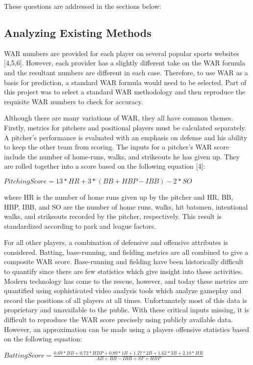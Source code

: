 \documentclass{article} %
\begin{document}
These questions are addressed in the sections below:


\subsection{Analyzing Existing Methods} 


WAR numbers are provided for each player on several popular sports websites [4,5,6].  However, each provider has a slightly different take on the WAR formula and the resultant numbers are different in each case.  Therefore, to use WAR as a basis for prediction, a standard WAR formula would need to be selected.  Part of this project was to select a standard WAR methodology and then reproduce the requisite WAR numbers to check for accuracy. 

Although there are many variations of WAR, they all have common themes. Firstly, metrics for pitchers and positional players must be calculated separately. A pitcher's performance is evaluated with an emphasis on defense and his ability to keep the other team from scoring.  The inputs for a pitcher's WAR score include the number of home-runs, walks, and strikeouts he has given up.  They are rolled together into a score based on the following equation [4]:
 \begin{center}
 $ Pitching Score = 13 * HR + 3* (BB + HBP - IBB) - 2*SO$
 \end{center} 
where HR is the number of home runs given up by the pitcher and HR, BB, HBP, IBB, and SO are the number of home runs, walks, hit batsmen, intentional walks, and strikeouts recorded by the pitcher, respectively.  This result is standardized according to park and league factors.

For all other players, a combination of defensive and offensive attributes is considered. Batting, base-running, and fielding metrics are all combined to give a composite WAR score.  Base-running and fielding have been historically difficult to quantify since there are few statistics which give insight into these activities.  Modern technology has come to the rescue, however, and today these metrics are quantified using sophisticated video analysis tools which analyze gameplay and record the positions of all players at all times.  Unfortunately most of this data is proprietary and unavailable to the public.  With these critical inputs missing, it is difficult to reproduce the WAR score precisely using publicly available data.  However, an approximation can be made using a players offensive statistics based on the following equation: 
 \begin{center}
 $ BattingScore = \frac{0.69 * BB + 0.72 * HBP + 0.89 * 1B + 1.27 * 2B + 1.62 * 3B + 2.10 * HR}{AB+BB-IBB+SF+HBP}$
 \end{center}
\end{document}

